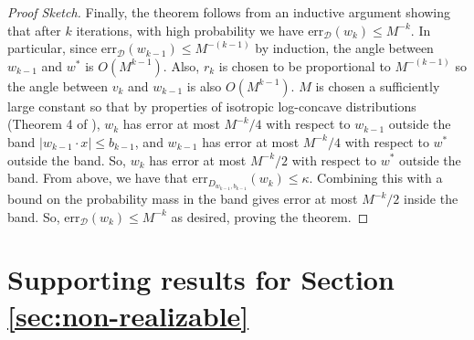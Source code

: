 \documentclass[11pt]{article}
\newcommand{\err}{\mathrm{err}}
\newcommand{\0}{\mathbf{0}}
\newcommand{\1}{\mathbf{1}}
\newcommand{\cD}{\mathcal{D}}
\begin{document}
\begin{proof}[Proof Sketch]
Finally, the theorem follows from an inductive argument showing that after $k$ iterations, with high probability we have $\err_\cD({w}_k) \leq M^{-k}$.  In particular, since $\err_\cD({w}_{k-1}) \leq M^{-(k-1)}$ by induction, the angle between $w_{k-1}$ and $w^*$ is $O(M^{k-1})$. Also, $r_k$ is chosen to be proportional to $M^{-(k-1)}$ so the angle between $v_k$ and $w_{k-1}$ is also $O(M^{k-1})$.  $M$ is chosen a sufficiently large constant so that by properties of isotropic log-concave distributions (Theorem 4 of \cite{balcan2013active}), $w_k$ has error at most $M^{-k}/4$ with respect to $w_{k-1}$ outside the band $|{w}_{k-1}\cdot
x| \leq b_{k-1}$, and $w_{k-1}$ has error at most $M^{-k}/4$ with respect to $w^*$ outside the band. So, $w_k$ has error at most $M^{-k}/2$ with respect to $w^*$ outside the band.  From above, we have that $\err_{D_{w_{k-1}, b_{k-1}}}({w_k}) \le \kappa$. Combining this with a bound on the probability mass in the band gives error at most $M^{-k}/2$ inside the band.  So, $\err_\cD({w}_k) \leq M^{-k}$ as desired, proving the theorem.
\end{proof}


\section{Supporting results for Section \ref{sec:non-realizable}}\label{app:agnostic}
\end{document}
